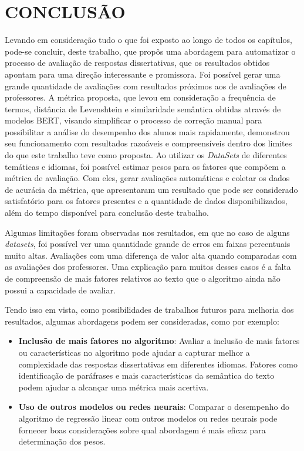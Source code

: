 \chapter{CONCLUSÃO}
Levando em consideração tudo o que foi exposto ao longo de todos os capítulos, pode-se concluir, deste trabalho, que propôs uma abordagem para automatizar o processo de avaliação de respostas dissertativas, que os resultados obtidos apontam para uma direção interessante e promissora. Foi possível gerar uma grande quantidade de avaliações com resultados próximos aos de avaliações de professores. A métrica proposta, que levou em consideração a frequência de termos, distância de Levenshtein e similaridade semântica obtidas através de modelos BERT, visando simplificar o processo de correção manual para possibilitar a análise do desempenho dos alunos mais rapidamente, demonstrou seu funcionamento com resultados razoáveis e compreensíveis dentro dos limites do que este trabalho teve como proposta. Ao utilizar os \textit{DataSets} de diferentes temáticas e idiomas, foi possível estimar pesos para os fatores que compõem a métrica de avaliação. Com eles, gerar avaliações automáticas e coletar os dados de acurácia da métrica, que apresentaram um resultado que pode ser considerado satisfatório para os fatores presentes e a quantidade de dados disponibilizados, além do tempo disponível para conclusão deste trabalho.

Algumas limitações foram observadas nos resultados, em que no caso de alguns \textit{datasets}, foi possível ver uma quantidade grande de erros em faixas percentuais muito altas. Avaliações com uma diferença de valor alta quando comparadas com as avaliações dos professores. Uma explicação para muitos desses casos é a falta de compreensão de mais fatores relativos ao texto que o algoritmo ainda não possui a capacidade de avaliar.

Tendo isso em vista, como possibilidades de trabalhos futuros para melhoria dos resultados, algumas abordagens podem ser consideradas, como por exemplo:

\begin{itemize}
    \item \textbf{Inclusão de mais fatores no algoritmo}: Avaliar a inclusão de mais fatores ou características no algoritmo pode ajudar a capturar melhor a complexidade das respostas dissertativas em diferentes idiomas. Fatores como identificação de paráfrases e mais características da semântica do texto podem ajudar a alcançar uma métrica mais acertiva.
    \item \textbf{Uso de outros modelos ou redes neurais}: Comparar o desempenho do algoritmo de regressão linear com outros modelos ou redes neurais pode fornecer boas considerações sobre qual abordagem é mais eficaz para determinação dos pesos.
\end{itemize}

